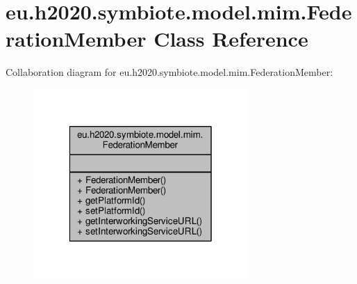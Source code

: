 \hypertarget{classeu_1_1h2020_1_1symbiote_1_1model_1_1mim_1_1FederationMember}{}\section{eu.\+h2020.\+symbiote.\+model.\+mim.\+Federation\+Member Class Reference}
\label{classeu_1_1h2020_1_1symbiote_1_1model_1_1mim_1_1FederationMember}


Collaboration diagram for eu.\+h2020.\+symbiote.\+model.\+mim.\+Federation\+Member\+:
\nopagebreak
\begin{figure}[H]
\begin{center}
\leavevmode
\includegraphics[width=232pt]{classeu_1_1h2020_1_1symbiote_1_1model_1_1mim_1_1FederationMember__coll__graph}
\end{center}
\end{figure}
